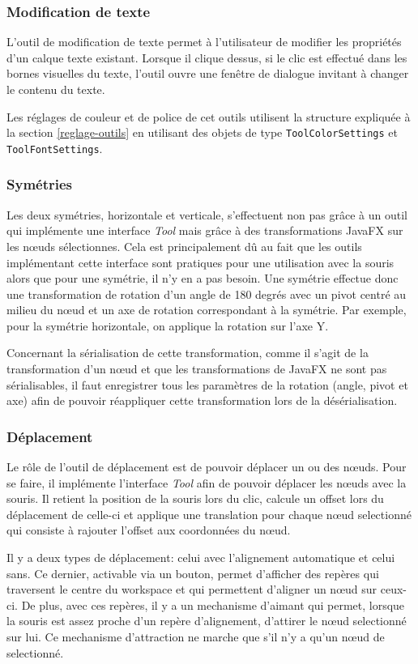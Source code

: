 \subsubsection{Modification de texte}
L'outil de modification de texte permet à l'utilisateur de modifier les propriétés d'un calque texte existant. Lorsque il clique dessus, si le clic est effectué dans les bornes visuelles du texte, l'outil ouvre une fenêtre de dialogue invitant à changer le contenu du texte.
\par
Les réglages de couleur et de police de cet outils utilisent la structure expliquée à la section \ref{reglage-outils} en utilisant des objets de type \texttt{ToolColorSettings} et \texttt{ToolFontSettings}.
\subsubsection{Symétries}

Les deux symétries, horizontale et verticale, s'effectuent non pas grâce à un outil qui implémente une interface \textit{Tool} mais grâce à des transformations JavaFX sur les n\oe uds sélectionnes. Cela est principalement dû au fait que les outils implémentant cette interface sont pratiques pour une utilisation avec la souris alors que pour une symétrie, il n'y en a pas besoin. Une symétrie effectue donc une transformation de rotation d'un angle de 180 degrés avec un pivot centré au milieu du n\oe ud et un axe de rotation correspondant à la symétrie. Par exemple, pour la symétrie horizontale, on applique la rotation sur l'axe Y.

Concernant la sérialisation de cette transformation, comme il s'agit de la transformation d'un n\oe ud et que les transformations de JavaFX ne sont pas sérialisables, il faut enregistrer tous les paramètres de la rotation (angle, pivot et axe) afin de pouvoir réappliquer cette transformation lors de la désérialisation.
\subsubsection{Déplacement}
Le rôle de l'outil de déplacement est de pouvoir déplacer un ou des n\oe uds. Pour se faire, il implémente l'interface \textit{Tool} afin de pouvoir déplacer les n\oe uds avec la souris. Il retient la position de la souris lors du clic, calcule un offset lors du déplacement de celle-ci et applique une translation pour chaque n\oe ud selectionné qui consiste à rajouter l'offset aux coordonnées du n\oe ud.

 Il y a deux types de déplacement: celui avec l'alignement automatique et celui sans. Ce dernier, activable via un bouton, permet d'afficher des repères qui traversent le centre du workspace et qui permettent d'aligner un n\oe ud sur ceux-ci. De plus, avec ces repères, il y a un mechanisme d'aimant qui permet, lorsque la souris est assez proche d'un repère d'alignement, d'attirer le n\oe ud selectionné sur lui. Ce mechanisme d'attraction ne marche que s'il n'y a qu'un n\oe ud de selectionné.
